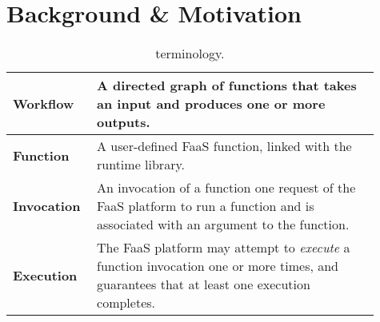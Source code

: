 \section{Background \& Motivation}\label{sec:bg}

\begin{table}
  \centering
  \begin{tabular}{|m{0.18\linewidth}|m{0.73\linewidth}|}
    \hline
  \textbf{Workflow} & A directed graph of functions that takes an input and produces one or more outputs. \\
    \hline
  \textbf{Function} & A user-defined FaaS function, linked with the \name{} runtime library. \\
    \hline
  \textbf{Invocation} & An invocation of a function one request of the FaaS platform to run a function and is associated with an argument to the function. \\
    \hline
  \textbf{Execution} & The FaaS platform may attempt to \emph{execute} a function invocation one or more times, and guarantees that at least one execution completes. \\
    \hline
  \end{tabular}
  \caption{\name{} terminology.}
  \label{table:terms}
\end{table}




